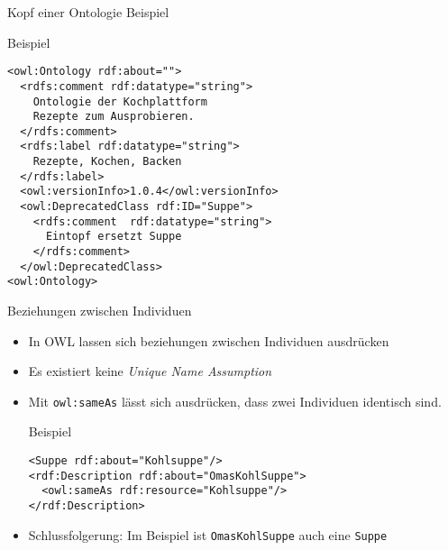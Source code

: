 \documentclass{beamer}
\begin{document}
\begin{frame}[fragile]{Kopf einer Ontologie Beispiel}
\begin{block}{Beispiel}
\begin{lstlisting}[lang="xml"]
<owl:Ontology rdf:about=""> 
  <rdfs:comment rdf:datatype="string">
    Ontologie der Kochplattform 
    Rezepte zum Ausprobieren.		
  </rdfs:comment>
  <rdfs:label rdf:datatype="string">
    Rezepte, Kochen, Backen
  </rdfs:label>
  <owl:versionInfo>1.0.4</owl:versionInfo>
  <owl:DeprecatedClass rdf:ID="Suppe">
    <rdfs:comment  rdf:datatype="string">
      Eintopf ersetzt Suppe
    </rdfs:comment>
  </owl:DeprecatedClass>
<owl:Ontology>
\end{lstlisting}
\end{block}
\end{frame}



\begin{frame}[fragile]{Beziehungen zwischen Individuen}
\begin{itemize}
\item In OWL lassen sich beziehungen zwischen Individuen ausdrücken
\item Es existiert keine \emph{Unique Name Assumption}
\item Mit \texttt{owl:sameAs} lässt sich ausdrücken, dass zwei
Individuen identisch sind.

\begin{exampleblock}{Beispiel}
\begin{lstlisting}[lang="xml"]
<Suppe rdf:about="Kohlsuppe"/>
<rdf:Description rdf:about="OmasKohlSuppe">
  <owl:sameAs rdf:resource="Kohlsuppe"/>
</rdf:Description>
\end{lstlisting}
\end{exampleblock}
\item \alert{Schlussfolgerung:} Im Beispiel ist \texttt{OmasKohlSuppe} auch eine
\texttt{Suppe}
\end{itemize}
\end{frame}
\end{document}
